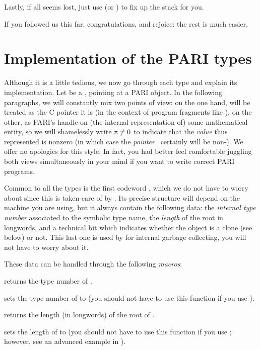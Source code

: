 Lastly, if all seems lost, just use  (or )
to fix up the stack for you.

\smallskip If you followed us this far, congratulations, and rejoice: the
rest is much easier.

\section{Implementation of the PARI types}
\label{se:impl}

\noindent
Although it is a little tedious, we now go through each type and explain its
implementation. Let  be a , pointing at a PARI object. In
the following paragraphs, we will constantly mix two points of view: on the
one hand,  will be treated as the C pointer it is (in the context of
program fragments like ), on the other, as PARI's handle on (the
internal representation of) some mathematical entity, so we will shamelessly
write ${\tt z} \ne 0$ to indicate that the \emph{value} thus represented
is nonzero (in which case the \emph{pointer}~ certainly will be
non-). We offer no apologies for this style. In fact, you had
better feel comfortable juggling both views simultaneously in your mind if
you want to write correct PARI programs.

Common to all the types is the
first codeword , which we do not have to worry about since this is
taken care of by . Its precise structure will depend on the
machine you are using, but it always contain the following data: the
\emph{internal type number} associated to the symbolic type
name, the \emph{length} of the root in longwords, and a technical bit
which indicates whether the object is a clone (see below) or not. This last
one is used by  for internal garbage collecting, you will not have to
worry about it.

\noindent These data can be handled through the following \emph{macros}:

 returns the type number of .

 sets the type number of  to
 (you should not have to use this function if you use ).

 returns the length (in longwords) of the root of .

 sets the length of  to  (you
should not have to use this function if you use ; however, see
an advanced example in ).

